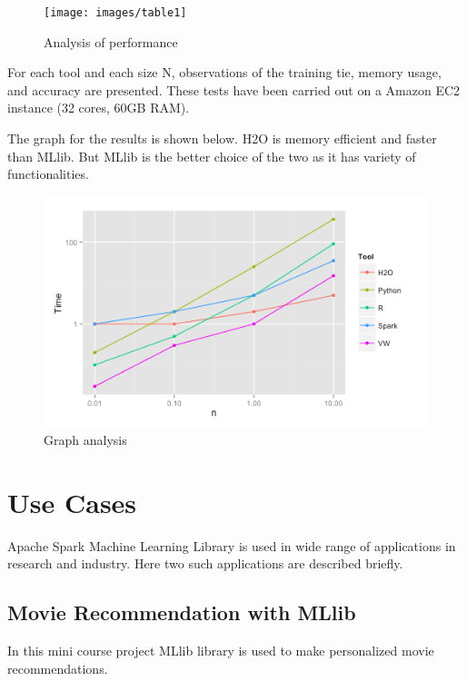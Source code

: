 \documentclass[9pt,twocolumn,twoside]{../../styles/osajnl}
\begin{document}
\begin{figure}[htbp]
\begin{center}
\centering
\texttt{[image: images/table1]}
\caption{Analysis of performance}
\label{fig:false-color}
\end{center}
\end{figure}

For each tool and each size N, observations of the training tie,
memory usage, and accuracy are presented. These tests have been
carried out on a Amazon EC2 instance (32 cores, 60GB
RAM).\cite{Analysis-webpage}

The graph for the results is shown below. H2O is memory efficient and
faster than MLlib. But MLlib is the better choice of the two as it has
variety of functionalities.

\begin{figure}[htbp]
\begin{center}
\centering
\includegraphics[width=\linewidth]{images/analysisgraph}
\caption{Graph analysis}
\label{fig:false-color}
\end{center}
\end{figure}

\section{Use Cases}
Apache Spark Machine Learning Library is used in wide range of applications
in research and industry. Here two such applications are described
briefly.

\subsection{Movie Recommendation with MLlib}
In this mini course project MLlib library is used to make personalized
movie recommendations.\cite{Movie-Recommender}
\end{document}
